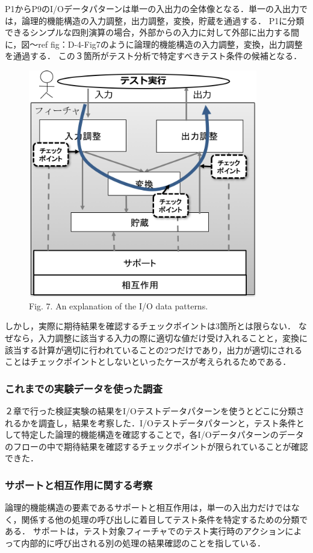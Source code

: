 \documentclass[10pt,a4j]{jarticle}
\begin{document}
P1からP9のI/Oデータパターンは単一の入出力の全体像となる．単一の入出力では，論理的機能構造の入力調整，出力調整，変換，貯蔵を通過する．
P1に分類できるシンプルな四則演算の場合，外部からの入力に対して外部に出力する間に，図〜ref {fig：D-4-Fig7}のように論理的機能構造の入力調整，変換，出力調整を通過する．
この３箇所がテスト分析で特定すべきテスト条件の候補となる．
  \begin{figure}[htbp]
 \begin{center}
 \includegraphics[width=10cm]{./image/D-4-Fig7.png}
 \caption{Fig. 7. An explanation of the I/O data patterns.}
 \label{fig:D-4-Fig7}
 \end{center}
  \end{figure}

しかし，実際に期待結果を確認するチェックポイントは3箇所とは限らない．
なぜなら，入力調整に該当する入力の際に適切な値だけ受け入れることと，変換に該当する計算が適切に行われていることの2つだけであり，出力が適切にされることはチェックポイントとしないといったケースが考えられるためである．

\subsubsection{これまでの実験データを使った調査}
２章で行った検証実験の結果をI/Oテストデータパターンを使うとどこに分類されるかを調査し，結果を考察した．I/Oテストデータパターンと，テスト条件として特定した論理的機能構造を確認することで，各I/Oデータパターンのデータのフローの中で期待結果を確認するチェックポイントが限られていることが確認できた．

\subsubsection{サポートと相互作用に関する考察}
論理的機能構造の要素であるサポートと相互作用は，単一の入出力だけではなく，関係する他の処理の呼び出しに着目してテスト条件を特定するための分類である．
サポートは，テスト対象フィーチャでのテスト実行時のアクションによって内部的に呼び出される別の処理の結果確認のことを指している．
\end{document}

